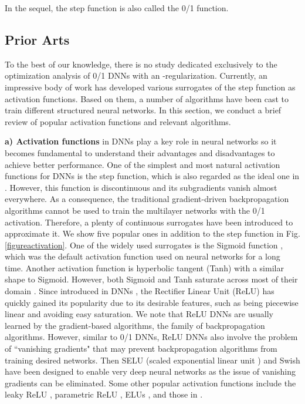 \documentclass[journal]{IEEEtran}
\begin{document}
In the sequel,  the step function is also called the 0/1 function. 
\subsection{Prior Arts} \label{Section-relatedlectures}
To the best of our knowledge, there is no study dedicated exclusively to the optimization analysis of 0/1 DNNs with an -regularization. Currently, an impressive body of work has developed various surrogates of the step function as  activation functions. Based on them, a number of algorithms have been cast to train different structured neural networks. In this section, we conduct a brief review of  popular activation functions and relevant algorithms.

{\bf a) Activation functions} in DNNs play a key role in neural networks so it becomes fundamental to understand their advantages and disadvantages to achieve better performance. One of the simplest and most natural activation functions for DNNs is the step function, which is also regarded as the ideal one in \cite{zhouzhihua}. However, this function is discontinuous and its subgradients vanish almost everywhere. As a consequence, the traditional gradient-driven backpropagation algorithms \cite{Rumelhart1986} cannot be used to train the multilayer networks with the 0/1 activation. Therefore, a plenty of
continuous surrogates have been introduced to approximate it.  We show five popular ones in addition to the step function in Fig. \ref{figureactivation}. One of the widely used surrogates is the Sigmoid function \cite{Han1995}, which was the default activation function used on neural networks for a long time. Another activation function is hyperbolic tangent (Tanh) with a similar shape to Sigmoid.  However, both Sigmoid and Tanh saturate across most of their domain \cite{Goodfellow2016}.
 Since introduced in DNNs \cite{Nair2012}, the Rectifier Linear Unit (ReLU) has quickly gained its popularity due to its desirable features, such as being piecewise linear and avoiding easy saturation. We note that ReLU DNNs are usually learned by the gradient-based algorithms, the family of backpropagation algorithms. However, similar to 0/1 DNNs, ReLU DNNs also involve the problem of ``vanishing gradients" that may prevent backpropagation algorithms from training desired networks. Then SELU (scaled exponential linear unit \cite{Klambauer2017}) and Swish \cite{Ramachandran2017} have been designed to enable very deep neural networks as the issue of vanishing gradients can be  eliminated. Some other popular activation functions include the leaky ReLU \cite{Maas2013},  parametric ReLU \cite{He2015},  ELUs \cite{Clevert2015}, and those in \cite{Goodfellow2016}.
\end{document}
